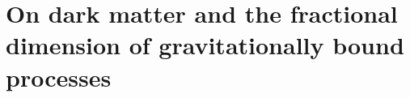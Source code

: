 \documentclass[12pt]{article}
\begin{document}
{%








\section{On dark matter and the fractional dimension of gravitationally bound processes}

}
\end{document}
